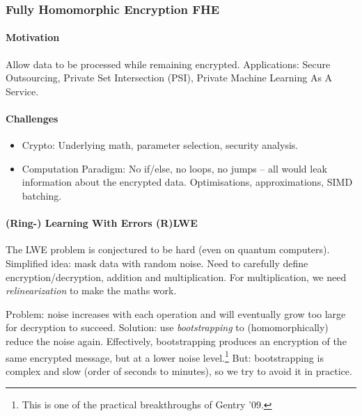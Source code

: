 \subsubsection{Fully Homomorphic Encryption FHE}

\paragraph{Motivation}
Allow data to be processed while remaining encrypted.
Applications: Secure Outsourcing, Private Set Intersection (PSI), Private Machine Learning As A Service.

\paragraph{Challenges}
\begin{itemize}
\item Crypto: Underlying math, parameter selection, security analysis.
\item Computation Paradigm: No if/else, no loops, no jumps -- all would leak
information about the encrypted data. Optimisations, approximations, SIMD batching.
\end{itemize}

\paragraph{(Ring-) Learning With Errors (R)LWE}
The LWE problem is conjectured to be hard (even on quantum computers).
Simplified idea: mask data with random noise.
Need to carefully define encryption/decryption, addition and multiplication.
For multiplication, we need \emph{relinearization} to make the maths work.

Problem: noise increases with each operation and will eventually grow too large for decryption to succeed.
Solution: use \emph{bootstrapping} to (homomorphically) reduce the noise again.
Effectively, bootstrapping produces an encryption of the same encrypted message,
but at a lower noise level.\footnote{This is one of the practical breakthroughs of Gentry '09.}
But: bootstrapping is complex and slow (order of seconds to minutes), so we try to avoid it in practice.

